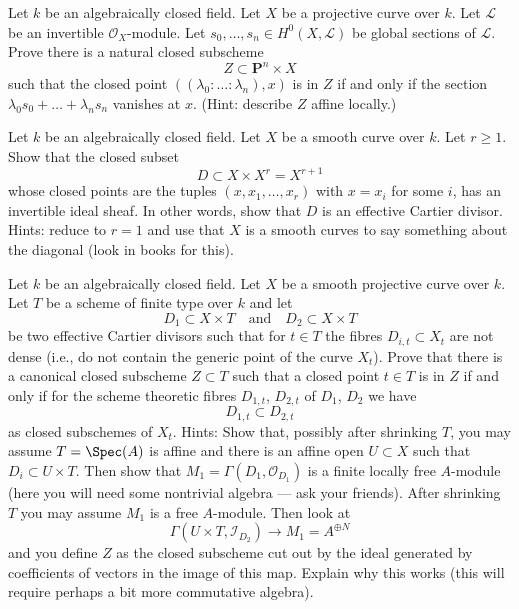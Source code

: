 \begin{exercise}
\label{exercise-closed-subset-vanshing}
Let $k$ be an algebraically closed field. Let $X$ be a projective curve
over $k$. Let $\mathcal{L}$ be an invertible $\mathcal{O}_X$-module.
Let $s_0, \ldots, s_n \in H^0(X, \mathcal{L})$
be global sections of $\mathcal{L}$.
Prove there is a natural closed subscheme
$$
Z \subset
\mathbf{P}^n \times X
$$
such that the closed point
$((\lambda_0 : \ldots : \lambda_n), x)$
is in $Z$ if and only if the section
$\lambda_0 s_0 + \ldots + \lambda_n s_n$
vanishes at $x$. (Hint: describe $Z$ affine locally.)
\end{exercise}

\begin{exercise}
\label{exercise-diagonal-cartier}
Let $k$ be an algebraically closed field. Let $X$ be a smooth curve over $k$.
Let $r \geq 1$. Show that the closed subset
$$
D \subset X \times X^r = X^{r + 1}
$$
whose closed points are the tuples $(x, x_1, \ldots, x_r)$ with
$x = x_i$ for some $i$, has an invertible ideal sheaf. In other words,
show that
$D$ is an effective Cartier divisor. Hints: reduce to $r = 1$ and
use that $X$ is a smooth curves to say something about the diagonal
(look in books for this).
\end{exercise}

\begin{exercise}
\label{exercise-one-divisor-in-another}
Let $k$ be an algebraically closed field. Let $X$ be a smooth projective curve
over $k$. Let $T$ be a scheme of finite type over $k$ and let
$$
D_1 \subset X \times T
\quad\text{and}\quad
D_2 \subset X \times T
$$
be two effective Cartier divisors such that for $t \in T$ the
fibres $D_{i, t} \subset X_t$ are not dense (i.e., do not contain
the generic point of the curve $X_t$).
Prove that there is a canonical closed subscheme
$Z \subset T$ such that a closed point $t \in T$ is in $Z$
if and only if for the scheme theoretic fibres $D_{1, t}$, $D_{2, t}$
of $D_1$, $D_2$ we have
$$
D_{1, t} \subset D_{2, t}
$$
as closed subschemes of $X_t$.
Hints: Show that, possibly after shrinking $T$, you may
assume $T = \Spec(A)$ is affine and there is an affine open $U \subset X$
such that $D_i \subset U \times T$. Then show that
$M_1 = \Gamma(D_1, \mathcal{O}_{D_1})$ is a finite locally free $A$-module
(here you will need some nontrivial algebra --- ask your friends).
After shrinking $T$ you may assume $M_1$ is a free $A$-module.
Then look at
$$
\Gamma(U \times T, \mathcal{I}_{D_2}) \to M_1 = A^{\oplus N}
$$
and you define $Z$ as the closed subscheme cut out by the ideal generated
by coefficients of vectors in the image of this map. Explain why this works
(this will require perhaps a bit more commutative algebra).
\end{exercise}

